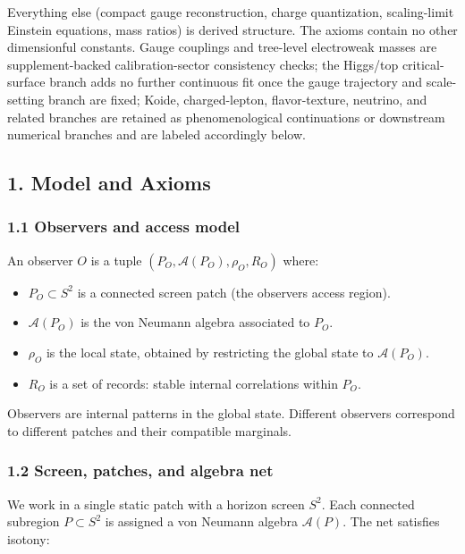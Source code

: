 Everything else (compact gauge reconstruction, charge quantization, scaling-limit Einstein equations, mass ratios) is derived structure. The axioms contain no other dimensionful constants. Gauge couplings and tree-level electroweak masses are supplement-backed calibration-sector consistency checks; the Higgs/top critical-surface branch adds no further continuous fit once the gauge trajectory and scale-setting branch are fixed; Koide, charged-lepton, flavor-texture, neutrino, and related branches are retained as phenomenological continuations or downstream numerical branches and are labeled accordingly below.

\subsection{1. Model and Axioms}\label{1-model-and-axioms}

\subsubsection{1.1 Observers and access model}\label{11-observers-and-access-model}

An observer \(O\) is a tuple \((P_O, \mathcal{A}(P_O), \rho_O, R_O)\) where:

\begin{itemize}
\tightlist
\item
  \(P_O \subset S^2\) is a connected screen patch (the observer\textquotesingle s access region).
\item
  \(\mathcal{A}(P_O)\) is the von Neumann algebra associated to \(P_O\).
\item
  \(\rho_O\) is the local state, obtained by restricting the global state to \(\mathcal{A}(P_O)\).
\item
  \(R_O\) is a set of records: stable internal correlations within \(P_O\).
\end{itemize}

Observers are internal patterns in the global state. Different observers correspond to different patches and their compatible marginals.

\subsubsection{1.2 Screen, patches, and algebra net}\label{12-screen-patches-and-algebra-net}

We work in a single static patch with a horizon screen \(S^2\). Each connected subregion \(P \subset S^2\) is assigned a von Neumann algebra \(\mathcal{A}(P)\). The net satisfies isotony:

